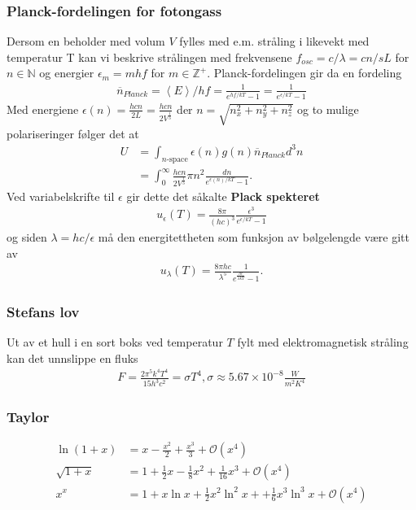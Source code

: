 \documentclass[a4paper, norsk, 10pt]{article}
\newcommand{\EQU}[1] { \begin{equation*} \begin{split}
#1  
\end{split} \end{equation*} }
\newcommand{\expe}[1] { \left\langle#1\right\rangle }
\begin{document}
\begin{multicols*}{2}
\subsubsection*{Planck-fordelingen for fotongass}
Dersom en beholder med volum $V$ fylles med e.m. stråling i likevekt med temperatur T kan vi beskrive strålingen med frekvensene $f_{osc}=c/\lambda=cn/sL$ for $n\in \mathbb{N}$ og energier $\epsilon_m = mhf$ for $m \in \mathbb{Z}^+$. Planck-fordelingen gir da en fordeling
\EQU{
\overline{n}_{Planck} = \expe{E}/hf = \frac{1}{e^{hf/kT}-1} = \frac{1}{e^{\epsilon/kT}-1}
}
Med energiene $\epsilon(n)=\frac{hcn}{2L}=\frac{hcn}{2V^\frac{1}{3} }$ der $n=\sqrt{n_x^2+n_y^2+n_z^2}$ og to mulige polariseringer følger det at
\EQU{
U &= \int_{n\text{-space}} \epsilon(n) g(n) \overline{n}_{Planck} d^3n \\
&= \int_0^\infty \frac{hcn}{2V^\frac{1}{3}}\pi n^2 \frac{dn}{e^{\epsilon(n)/kT}-1}.
}
Ved variabelskrifte til $\epsilon$ gir dette det såkalte \textbf{Plack spekteret}
\EQU{
u_\epsilon(T)=\frac{8\pi}{(hc)^3} \frac{\epsilon^3}{e^{\epsilon/kT}-1}
}
og siden $\lambda = hc/\epsilon$ må den energitettheten som funksjon av bølgelengde være gitt av
\EQU{
u_\lambda(T) = \frac{8\pi hc}{\lambda^5} \frac{1}{e^{\frac{hc}{\lambda kT}}-1}.
}


\subsubsection*{Stefans lov}
Ut av et hull i en sort boks ved temperatur $T$ fylt med elektromagnetisk stråling kan det unnslippe en fluks
\EQU{
F = \frac{2\pi^5 k^4 T^4}{15h^3c^2} = \sigma T^4, \sigma \approx 5.67 \times 10^{-8}\frac{W}{m^2K^4}
}

\subsubsection*{Taylor}
\EQU{
\ln (1+x) &= x- \frac{x^2}{2} + \frac{x^3}{3}+\mathcal{O}(x^4) \\
\sqrt{1+x} &= 1+\frac{1}{2}x-\frac{1}{8}x^2+\frac{1}{16}x^3 +\mathcal{O}(x^4) \\
x^x & = 1+x \ln x + \frac{1}{2} x^2 \ln^2 x + +\frac{1}{6}x^3 \ln^3 x + \mathcal{O}(x^4)
}

\end{multicols*}
\end{document}
